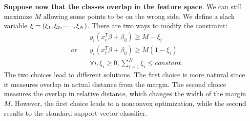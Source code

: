 \documentclass[12pt, letterpaper]{article}
\theoremstyle{definition}
\DeclarePairedDelimiter\autobracket{(}{)}
\newcommand{\br}[1]{\autobracket*{#1}}
\begin{document}
\textbf{Suppose now that the classes overlap in the feature space}. We can still maximize $M$ allowing some points to be on the wrong side. We define a slack variable $\xi=\br{\xi_1, \xi_2, \cdots, \xi_N}$. There are two ways to modify the constraint:
\begin{equation}
\begin{aligned}
&y_i (x_i^T\beta+\beta_0)\ge M -\xi_i\\
\textit{or} \quad&y_i (x_i^T\beta+\beta_0)\ge M (1-\xi_i)\\
&\forall i, \xi_i\ge  0, \sum_{i=1}^N \xi_i \le constant.
\end{aligned}
\end{equation}
The two choices lead to different solutions. The first choice is more natural since it measures overlap in actual distance from the margin. The second choice measures the overlap in relative distance, which changes the width of the margin $M$. However, the first choice leads to a nonconvex optimization, while the second results to the standard support vector classifier. 
\end{document}
